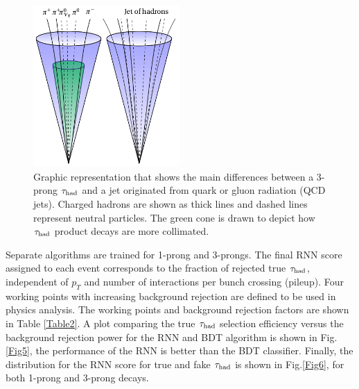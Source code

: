 \begin{figure}[h]
	\centering
	\includegraphics[width=0.5\textwidth]{figures/Fig4}
	\caption{Graphic representation that shows the main differences between a 3-prong $\tau_\text{had}$ and a jet originated from quark or gluon radiation (QCD jets). Charged hadrons are shown as thick lines and dashed lines represent neutral particles. The green cone is drawn to depict how $\tau_\text{had}$ product decays are more collimated.}
	\label{Fig4}
\end{figure}
Separate algorithms are trained for 1-prong and 3-prongs. The final RNN score assigned to each event corresponds to the fraction of rejected true $\tau_\text{had}$, independent of $p_T$ and number of interactions per bunch crossing (pileup). Four working points with increasing background rejection are defined to be used in physics analysis. The working points and background rejection factors are shown in Table \ref{Table2}. A plot comparing the true $\tau_\text{had}$ selection efficiency versus the background rejection power for the RNN and BDT algorithm is shown in Fig.\ref{Fig5}, the performance of the RNN is better than the BDT classifier. Finally, the distribution for the RNN score for true and fake $\tau_\text{had}$ is shown in Fig.\ref{Fig6}, for both 1-prong and 3-prong decays.
